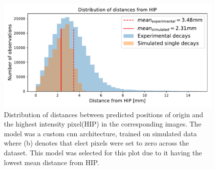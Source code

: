 \begin{figure}
\centering
\includegraphics[width=\textwidth]{chapters/results/figures/experimental_pos_dist.pdf}
\caption{\label{fig:experimental-pos-dist} Distribution of distances between predicted
positions of origin and the highest intensity pixel(HIP) in the corresponding images. 
The model was a custom cnn architecture, trained on simulated data where (b) denotes 
that elect pixels were set to zero across the dataset. This model was selected for this
plot due to it having the lowest mean distance from HIP.}
\end{figure}